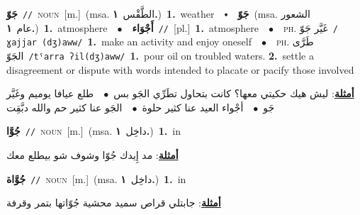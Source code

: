 \documentclass[10pt,a4paper,twoside]{article} %
\begin{document}
\begin{multicols}{2}
{\setlength\topsep{0pt}\textbf{\foreignlanguage{arabic}{جَوّ}}\ {\color{gray}\texttt{//}\color{black}}\ \textsc{noun}\ [m.]\ \color{gray}(msa. \foreignlanguage{arabic}{الطَّقْس}~\foreignlanguage{arabic}{\textbf{١.}})\color{black}\ \textbf{1.}~weather\ \ $\smblkdiamond$\ \ \setlength\topsep{0pt}\textbf{\foreignlanguage{arabic}{جَوّ}}\ \color{gray}(msa. \foreignlanguage{arabic}{الشعور عام}~\foreignlanguage{arabic}{\textbf{١.}})\color{black}\ \textbf{1.}~atmosphere\ \ $\bullet$\ \ \setlength\topsep{0pt}\textbf{\foreignlanguage{arabic}{أَجْوَاء}}\ {\color{gray}\texttt{//}\color{black}}\ [pl.]\ \textbf{1.}~atmosphere\ \ $\bullet$\ \ \textsc{ph.} \color{gray} \foreignlanguage{arabic}{غَيَّر جَوّ}\color{black}\ {\color{gray}\texttt{/{\sffamily ɣajjar (dʒ)aww}/}\color{black}}\ \textbf{1.}~make an activity and enjoy oneself\ \ $\bullet$\ \ \textsc{ph.} \color{gray} \foreignlanguage{arabic}{طَرَّى الجَوّ}\color{black}\ {\color{gray}\texttt{/{\sffamily tˤarra ʔil(dʒ)aww}/}\color{black}}\ \textbf{1.}~pour oil on troubled waters.  \textbf{2.}~settle a disagreement or dispute with words intended to placate or pacify those involved\  \begin{flushright}\color{gray}\foreignlanguage{arabic}{\textbf{\underline{\foreignlanguage{arabic}{أمثلة}}}: ليش هيك حكيتي معها؟ كانت بتحاول تطَرِّي الجَو بس\ $\bullet$\ \  طلع عيافا يوميم وغَيَّر جَو\ $\bullet$\ \  أجْواء العيد عنا كثير حلوة\ $\bullet$\ \  الجَو عنا كثير حم والله دبَّقِت}\end{flushright}\color{black}} \vspace{2mm}

{\setlength\topsep{0pt}\textbf{\foreignlanguage{arabic}{جُوَّا}}\ {\color{gray}\texttt{//}\color{black}}\ \textsc{noun}\ [m.]\ \color{gray}(msa. \foreignlanguage{arabic}{داخِل}~\foreignlanguage{arabic}{\textbf{١.}})\color{black}\ \textbf{1.}~in\  \begin{flushright}\color{gray}\foreignlanguage{arabic}{\textbf{\underline{\foreignlanguage{arabic}{أمثلة}}}: مد إِيدك جُوّا وشوف شو بيطلع معك}\end{flushright}\color{black}} \vspace{2mm}

{\setlength\topsep{0pt}\textbf{\foreignlanguage{arabic}{جُوَّاة}}\ {\color{gray}\texttt{//}\color{black}}\ \textsc{noun}\ [m.]\ \color{gray}(msa. \foreignlanguage{arabic}{داخِل}~\foreignlanguage{arabic}{\textbf{١.}})\color{black}\ \textbf{1.}~in\  \begin{flushright}\color{gray}\foreignlanguage{arabic}{\textbf{\underline{\foreignlanguage{arabic}{أمثلة}}}: جابتلي قراص سميد محشية جُوّاتها بتمر وقرفة}\end{flushright}\color{black}} \vspace{2mm}


\end{multicols}
\end{document}

